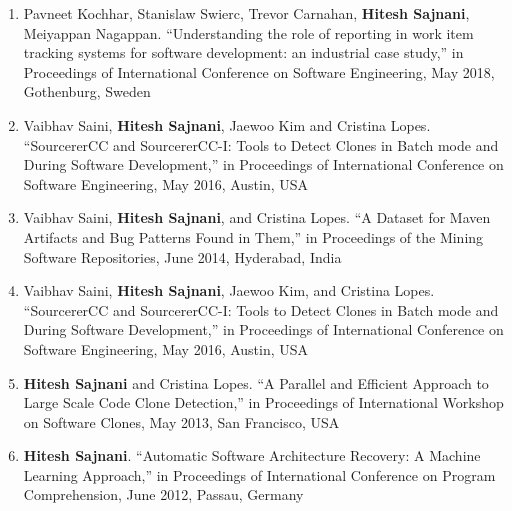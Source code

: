 \documentclass[letterpaper,11pt]{article}
\begin{document}
\begin{enumerate}

\item\small{Pavneet Kochhar, Stanislaw Swierc, Trevor Carnahan, \textbf{Hitesh Sajnani}, Meiyappan Nagappan. “Understanding the role of reporting in work item tracking systems for software development: an industrial case study,” in Proceedings of International Conference on Software Engineering, May 2018, Gothenburg, Sweden  }

   \vspace{-1pt}\item\small{Vaibhav Saini, \textbf{Hitesh Sajnani}, Jaewoo Kim and Cristina Lopes. “SourcererCC and
SourcererCC-I: Tools to Detect Clones in Batch mode and During Software Development,”
in Proceedings of International Conference on Software Engineering, May 2016,
Austin, USA }

   \vspace{-1pt}\item\small{Vaibhav Saini, \textbf{Hitesh Sajnani}, and Cristina Lopes. “A Dataset for Maven Artifacts and
Bug Patterns Found in Them,” in Proceedings of the Mining Software Repositories, June
2014, Hyderabad, India }
   \vspace{-1pt}\item\small{Vaibhav Saini, \textbf{Hitesh Sajnani}, Jaewoo Kim, and Cristina Lopes. “SourcererCC and
SourcererCC-I: Tools to Detect Clones in Batch mode and During Software Development,”
in Proceedings of International Conference on Software Engineering, May 2016,
Austin, USA }
   \vspace{-1pt}\item\small{\textbf{Hitesh Sajnani} and Cristina Lopes. “A Parallel and Efficient Approach to Large Scale
Code Clone Detection,” in Proceedings of International Workshop on Software Clones,
May 2013, San Francisco, USA }

   \vspace{-1pt}\item\small{\textbf{Hitesh Sajnani}. “Automatic Software Architecture Recovery: A Machine Learning
Approach,” in Proceedings of International Conference on Program Comprehension, June
2012, Passau, Germany }


\end{enumerate}
\end{document}
